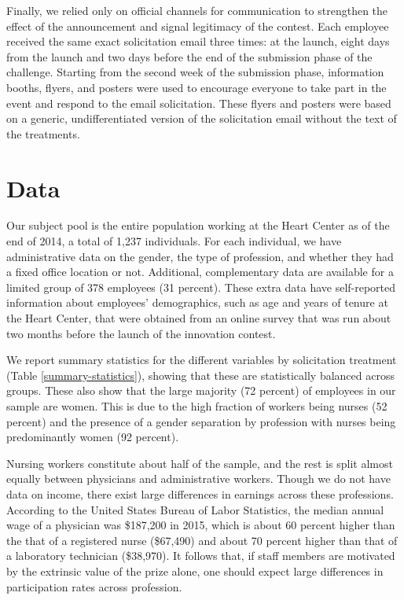 \documentclass[12pt, titlepage]{article}
\begin{document}
Finally, we relied only on official channels for communication to
strengthen the effect of the announcement and signal legitimacy of the
contest. Each employee received the same exact solicitation email three
times: at the launch, eight days from the launch and two days before the
end of the submission phase of the challenge. Starting from the second
week of the submission phase, information booths, flyers, and posters
were used to encourage everyone to take part in the event and respond to
the email solicitation. These flyers and posters were based on a
generic, undifferentiated version of the solicitation email without the
text of the treatments.

\section{Data}\label{data}

Our subject pool is the entire population working at the Heart Center as
of the end of 2014, a total of 1,237 individuals. For each individual,
we have administrative data on the gender, the type of profession, and
whether they had a fixed office location or not. Additional,
complementary data are available for a limited group of 378 employees
(31 percent). These extra data have self-reported information about
employees' demographics, such as age and years of tenure at the Heart
Center, that were obtained from an online survey that was run about two
months before the launch of the innovation contest.

We report summary statistics for the different variables by solicitation
treatment (Table \ref{summary-statistics}), showing that these are
statistically balanced across groups. These also show that the large
majority (72 percent) of employees in our sample are women. This is due
to the high fraction of workers being nurses (52 percent) and the
presence of a gender separation by profession with nurses being
predominantly women (92 percent).

Nursing workers constitute about half of the sample, and the rest is
split almost equally between physicians and administrative workers.
Though we do not have data on income, there exist large differences in
earnings across these professions. According to the United States Bureau
of Labor Statistics, the median annual wage of a physician was \$187,200
in 2015, which is about 60 percent higher than the that of a registered
nurse (\$67,490) and about 70 percent higher than that of a laboratory
technician (\$38,970). It follows that, if staff members are motivated
by the extrinsic value of the prize alone, one should expect large
differences in participation rates across profession.
\end{document}
